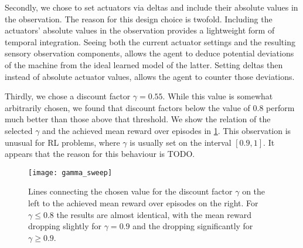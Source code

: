 Secondly, we chose to set actuators via deltas and include their absolute values in the observation. The reason for this design choice is twofold. Including the actuators' absolute values in the observation provides a lightweight form of temporal integration. Seeing both the current actuator settings and the resulting sensory observation components, allows the agent to deduce potential deviations of the machine from the ideal learned model of the latter. Setting deltas then instead of absolute actuator values, allows the agent to counter those deviations.

Thirdly, we chose a discount factor $\gamma = 0.55$. While this value is somewhat arbitrarily chosen, we found that discount factors below the value of $0.8$ perform much better than those above that threshold. We show the relation of the selected $\gamma$ and the achieved mean reward over episodes in \cref{fig:gamma_sweep}. This observation is unusual for \ac{RL} problems, where $\gamma$ is usually set on the interval $[0.9,1]$. It appears that the reason for this behaviour is TODO.

\begin{figure}
    \centering
    \texttt{[image: gamma\_sweep]}
    \caption{Lines connecting the chosen value for the discount factor $\gamma$ on the left to the achieved mean reward over episodes on the right. For $\gamma \leq 0.8$ the results are almost identical, with the mean reward dropping slightly for $\gamma = 0.9$ and the dropping significantly for $\gamma \geq 0.9$.}
    \label{fig:gamma_sweep}
\end{figure}
 
